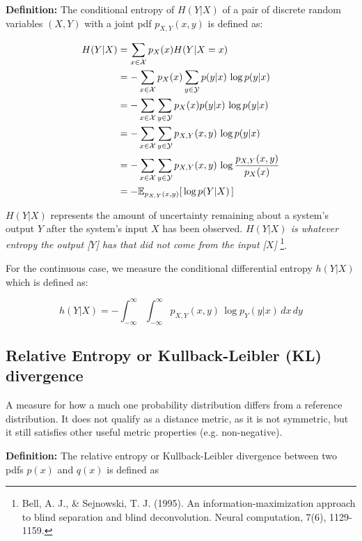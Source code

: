 \textbf{Definition:} 
The conditional entropy of $H(Y|X)$ of a pair of discrete random variables $(X,Y)$ with a joint pdf $p_{X,Y}(x,y)$ is defined as:

\begin{align}
\label{eq:entropycond}
H(Y|X) 
&= \sum_{x \in \mathcal{X}} p_X(x) H(Y|X=x) \\
&= -\sum_{x \in \mathcal{X}} p_X(x) \sum_{y \in \mathcal{Y}} p(y|x)\,\log p(y|x) \\
&= -\sum_{x \in \mathcal{X}} \sum_{y \in \mathcal{Y}} p_X(x) p(y|x)\,\log p(y|x) \\
&= -\sum_{x \in \mathcal{X}} \sum_{y \in \mathcal{Y}} p_{X,Y}(x,y)\,\log p(y|x) \\
&= -\sum_{x \in \mathcal{X}} \sum_{y \in \mathcal{Y}} p_{X,Y}(x,y)\,\log \frac{p_{X,Y}(x,y)}{p_X(x)} \\
&= -\mathbb{E}_{p_{X,Y}(x,y)} \lbrack \, \log p(Y|X) \, \rbrack \\
\end{align}

$H(Y|X)$ represents the amount of uncertainty remaining about a system's output $Y$ after the 
system's input $X$ has been observed. 
\emph{
$H(Y|X)$ is whatever entropy the output [$Y$] has that did not come from the input [$X$]
}
\footnote{
Bell, A. J., \& Sejnowski, T. J. (1995). An information-maximization approach to blind separation and blind deconvolution. Neural computation, 7(6), 1129-1159.
}.

For the continuous case, we measure the conditional differential entropy $h(Y|X)$ which is defined as:

\begin{equation}
h(Y|X) = -\int_{-\infty}^{\infty} \int_{-\infty}^{\infty} p_{X,Y}(x,y)\,\log  p_{Y}(y|x) \, dx \, dy
\label{eq:diffentropycondcontinuous}
\end{equation}

\subsection{Relative Entropy or Kullback-Leibler (KL) divergence}

A measure for how a much one probability distribution differs from a reference distribution. 
It does not qualify as a distance metric, as it is not symmetric, but it still satisfies other useful metric properties (e.g. non-negative).

\textbf{Definition:} 
The relative entropy or Kullback-Leibler divergence between two pdfs $p(x)$ and $q(x)$ is defined as

